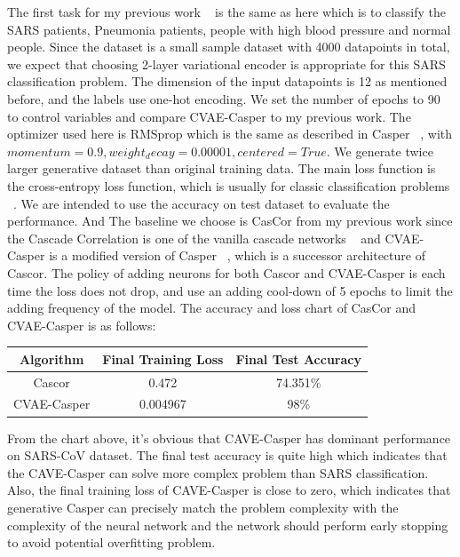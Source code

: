 The first task for my previous work ~\cite{selfref2021} is the same as here which is to classify the SARS patients, Pneumonia patients, people with high blood pressure and normal people. Since the dataset is a small sample dataset with 4000 datapoints in total, we expect that choosing 2-layer variational encoder is appropriate for this SARS classification problem. The dimension of the input datapoints is 12 as mentioned before, and the labels use one-hot encoding. We set the number of epochs to 90 to control variables and compare CVAE-Casper to my previous work. The optimizer used here is RMSprop which is the same as described in Casper ~\cite{CASPER1997}, with $momentum=0.9, weight_decay=0.00001, centered=True$. We generate twice larger generative dataset than original training data. The main loss function is the cross-entropy loss function, which is usually for classic classification problems ~\cite{semisupervised2021}. We are intended to use the accuracy on test dataset to evaluate the performance. And The baseline we choose is CasCor from my previous work since the Cascade Correlation is one of the vanilla cascade networks ~\cite{constructive} and CVAE-Casper is a modified version of Casper ~\cite{CASPER1997}, which is a successor architecture of Cascor. The policy of adding neurons for both Cascor and CVAE-Casper is each time the loss does not drop, and use an adding cool-down of 5 epochs to limit the adding frequency of the model. The accuracy and loss chart of CasCor and CVAE-Casper is as follows:
\begin{center}
\begin{tabular}{ c c c }
\hline
 Algorithm & Final Training Loss & Final Test Accuracy \\ 
\hline
 Cascor & 0.472 & 74.351\% \\  
\hline
 CVAE-Casper & 0.004967 & 98\% \\
\hline
\end{tabular}

\end{center}
From the chart above, it’s obvious that CAVE-Casper has dominant performance on SARS-CoV dataset. The final test accuracy is quite high which indicates that the CAVE-Casper can solve more complex problem than SARS classification. Also, the final training loss of CAVE-Casper is close to zero, which indicates that generative Casper can precisely match the problem complexity with the complexity of the neural network and the network should perform early stopping to avoid potential overfitting problem. 


